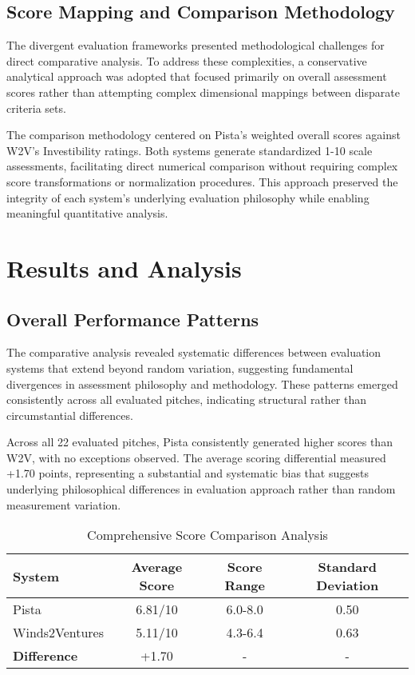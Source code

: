 \subsection{Score Mapping and Comparison Methodology}
\label{subsec:methodology-approach}

The divergent evaluation frameworks presented methodological challenges for direct comparative analysis. To address these complexities, a conservative analytical approach was adopted that focused primarily on overall assessment scores rather than attempting complex dimensional mappings between disparate criteria sets.

The comparison methodology centered on Pista's weighted overall scores against W2V's Investibility ratings. Both systems generate standardized 1-10 scale assessments, facilitating direct numerical comparison without requiring complex score transformations or normalization procedures. This approach preserved the integrity of each system's underlying evaluation philosophy while enabling meaningful quantitative analysis.

\section{Results and Analysis}
\label{sec:results}

\subsection{Overall Performance Patterns}
\label{subsec:performance}

The comparative analysis revealed systematic differences between evaluation systems that extend beyond random variation, suggesting fundamental divergences in assessment philosophy and methodology. These patterns emerged consistently across all evaluated pitches, indicating structural rather than circumstantial differences.

Across all 22 evaluated pitches, Pista consistently generated higher scores than W2V, with no exceptions observed. The average scoring differential measured +1.70 points, representing a substantial and systematic bias that suggests underlying philosophical differences in evaluation approach rather than random measurement variation.

\begin{table}[ht]
    \centering
    \caption{Comprehensive Score Comparison Analysis}
    \label{tab:score-comparison}
    \begin{tabular}{lccc}
        \toprule
        \textbf{System} & \textbf{Average Score} & \textbf{Score Range} & \textbf{Standard Deviation} \\
        \midrule
        Pista & 6.81/10 & 6.0-8.0 & 0.50 \\
        Winds2Ventures & 5.11/10 & 4.3-6.4 & 0.63 \\
        \midrule
        \textbf{Difference} & +1.70 & - & - \\
        \bottomrule
    \end{tabular}
\end{table}


